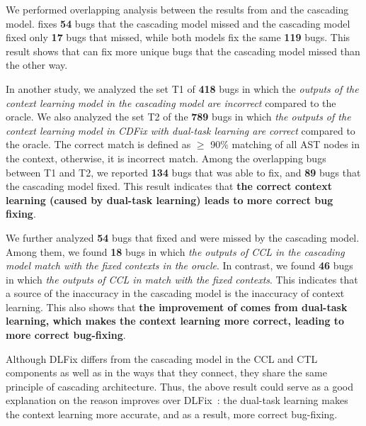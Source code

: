We performed overlapping analysis between the results
from {\tool} and the cascading model. {\tool} fixes {\bf 54} bugs that
the cascading model missed and the cascading model fixed only {\bf 17}
bugs that {\tool} missed, while both models fix the same {\bf 119}
bugs. This result shows that {\tool} can fix more unique bugs
that the cascading model missed than the other way.

In another study, we analyzed the set T1 of {\bf 418} bugs in which the
{\em outputs of the context learning model in the cascading model are
  incorrect} compared to the oracle. We also analyzed the set T2 of
the {\bf 789} bugs in which {\em the outputs of the context learning
  model in CDFix with dual-task learning are correct} compared to the
oracle. The correct match is defined as $\geq$ 90\% matching of all AST
nodes in the context, otherwise, it is incorrect match.
%
Among the overlapping bugs between T1 and T2, we reported {\bf 134}
bugs that {\tool} was able to fix, and {\bf 89} bugs that the
cascading model fixed.  This result indicates that {\bf the correct context
learning (caused by dual-task learning) leads to more correct bug
fixing}.

We further analyzed {\bf 54} bugs that {\tool} fixed and were missed
by the cascading model. Among them, we found {\bf 18} bugs in which
{\em the outputs of CCL in the cascading model match with the fixed
  contexts in the oracle}. In contrast, we found {\bf 46} bugs in
which {\em the outputs of CCL in {\tool} match with the fixed
  contexts}. This indicates that a source of the inaccuracy in the
cascading model is the inaccuracy of context learning. This also shows
that {\bf the improvement of {\tool} comes from dual-task learning,
  which makes the context learning more correct, leading to more
  correct bug-fixing}.





Although DLFix differs from the cascading model in the CCL and CTL
components as well as in the ways that they connect, they share the
same principle of cascading architecture. Thus, the above result could
serve as a good explanation on the reason {\tool} improves over
DLFix~\cite{icse20}: the dual-task learning makes the context learning
more accurate, and as a result, more correct bug-fixing.

